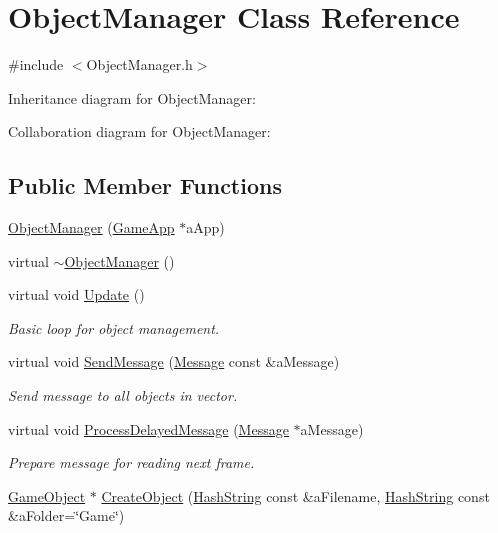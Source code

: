 \hypertarget{classObjectManager}{}\section{Object\+Manager Class Reference}
\label{classObjectManager}


{\ttfamily \#include $<$Object\+Manager.\+h$>$}



Inheritance diagram for Object\+Manager\+:


Collaboration diagram for Object\+Manager\+:
\subsection*{Public Member Functions}
\begin{DoxyCompactItemize}
\item 
\hyperlink{classObjectManager_add2889e2ebd9118e71180a4c88a3f346}{Object\+Manager} (\hyperlink{classGameApp}{Game\+App} $\ast$a\+App)
\item 
virtual \hyperlink{classObjectManager_a25b057e6d1e60c9cbeb29d41923d8c2c}{$\sim$\+Object\+Manager} ()
\item 
virtual void \hyperlink{classObjectManager_ac6035906749a40ec3a1d685ebed11c89}{Update} ()
\begin{DoxyCompactList}\small\item\em Basic loop for object management. \end{DoxyCompactList}\item 
virtual void \hyperlink{classObjectManager_a4d6aa33b172cd0d15575702fe4ef2e5d}{Send\+Message} (\hyperlink{classMessage}{Message} const \&a\+Message)
\begin{DoxyCompactList}\small\item\em Send message to all objects in vector. \end{DoxyCompactList}\item 
virtual void \hyperlink{classObjectManager_ab5d8bbac1f3e7e907ca8a8be2928e593}{Process\+Delayed\+Message} (\hyperlink{classMessage}{Message} $\ast$a\+Message)
\begin{DoxyCompactList}\small\item\em Prepare message for reading next frame. \end{DoxyCompactList}\item 
\hyperlink{classGameObject}{Game\+Object} $\ast$ \hyperlink{classObjectManager_ad1678826504d7847d8712e454f5675e5}{Create\+Object} (\hyperlink{classHashString}{Hash\+String} const \&a\+Filename, \hyperlink{classHashString}{Hash\+String} const \&a\+Folder=\char`\"{}Game\char`\"{})

\end{DoxyCompactItemize}
